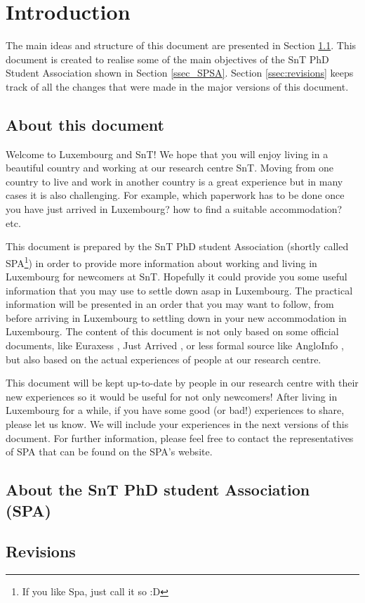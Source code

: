 \section{Introduction}
\label{sect.intro}


The main ideas and structure of this document are presented in Section \ref{ssec_about}. 
This document is created to realise some of the main objectives of the SnT PhD Student Association shown in Section \ref{ssec_SPSA}. 
Section \ref{ssec:revisions} keeps track of all the changes that were made in the major versions of this document. 

\subsection{About this document} \label{ssec_about}
Welcome to Luxembourg and SnT! We hope that you will enjoy living in a beautiful country and working at our research centre SnT. Moving from one country to live and work in another country is a great experience but in many cases it is also challenging. For example, which paperwork has to be done once you have just arrived in Luxembourg? how to find a suitable accommodation? etc. 

This document is prepared by the SnT PhD student Association (shortly called SPA\footnote{If you like Spa, just call it so :D}) in order to provide more information about working and living in Luxembourg for newcomers at SnT. Hopefully it could provide you some useful information that you may use to settle down asap in Luxembourg. The practical information will be presented in an order that you may want to follow, from before arriving in Luxembourg to settling down in your new accommodation in Luxembourg. 
The content of this document is not only based on some official documents, like Euraxess \cite{Euraxess}, Just Arrived \cite{JustArrived}, or less formal source like AngloInfo \cite{AngloINFO}, but also based on the actual experiences of people at our research centre. 

This document will be kept up-to-date by people in our research centre with their new experiences so it would be useful for not only newcomers! 
After living in Luxembourg for a while, if you have some good (or bad!) experiences to share, please let us know. 
We will include your experiences in the next versions of this document. 
For further information, please feel free to contact the representatives of SPA that can be found on the SPA's website. 

\subsection{About the SnT PhD student Association (SPA)}


\subsection{Revisions}
